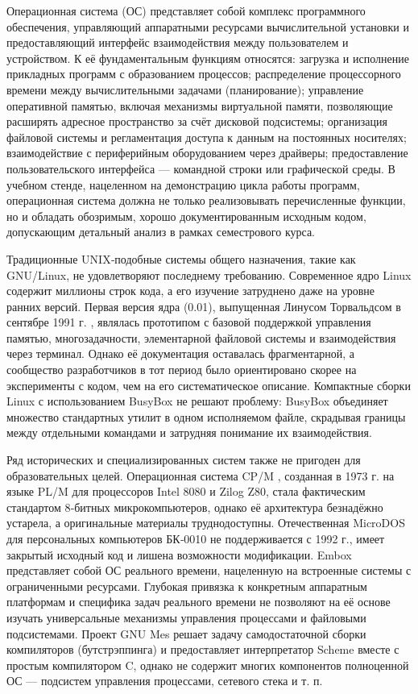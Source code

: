 Операционная система (ОС) представляет собой комплекс программного обеспечения, управляющий аппаратными ресурсами вычислительной установки и предоставляющий интерфейс взаимодействия между пользователем и устройством. К её фундаментальным функциям относятся: загрузка и исполнение прикладных программ с образованием процессов; распределение процессорного времени между вычислительными задачами (планирование); управление оперативной памятью, включая механизмы виртуальной памяти, позволяющие расширять адресное пространство за счёт дисковой подсистемы; организация файловой системы и регламентация доступа к данным на постоянных носителях; взаимодействие с периферийным оборудованием через драйверы; предоставление пользовательского интерфейса — командной строки или графической среды. В учебном стенде, нацеленном на демонстрацию цикла работы программ, операционная система должна не только реализовывать перечисленные функции, но и обладать обозримым, хорошо документированным исходным кодом, допускающим детальный анализ в рамках семестрового курса.

Традиционные UNIX‑подобные системы общего назначения, такие как GNU/Linux, не удовлетворяют последнему требованию. Современное ядро Linux содержит миллионы строк кода, а его изучение затруднено даже на уровне ранних версий. Первая версия ядра (0.01), выпущенная Линусом Торвальдсом в сентябре 1991 г. \cite{fstlinux}, являлась прототипом с базовой поддержкой управления памятью, многозадачности, элементарной файловой системы и взаимодействия через терминал. Однако её документация оставалась фрагментарной, а сообщество разработчиков в тот период было ориентировано скорее на эксперименты с кодом, чем на его систематическое описание. Компактные сборки Linux с использованием BusyBox \cite{BusyBox} не решают проблему: BusyBox объединяет множество стандартных утилит в одном исполняемом файле, скрадывая границы между отдельными командами и затрудняя понимание их взаимодействия.

Ряд исторических и специализированных систем также не пригоден для образовательных целей. Операционная система CP/M \cite{CPM}, созданная в 1973 г. на языке PL/M для процессоров Intel 8080 и Zilog Z80, стала фактическим стандартом 8‑битных микрокомпьютеров, однако её архитектура безнадёжно устарела, а оригинальные материалы труднодоступны. Отечественная MicroDOS \cite{MicroDOS} для персональных компьютеров БК‑0010 не поддерживается с 1992 г., имеет закрытый исходный код и лишена возможности модификации. Embox \cite{Embox} представляет собой ОС реального времени, нацеленную на встроенные системы с ограниченными ресурсами. Глубокая привязка к конкретным аппаратным платформам и специфика задач реального времени не позволяют на её основе изучать универсальные механизмы управления процессами и файловыми подсистемами. Проект GNU Mes \cite{GNUMes} решает задачу самодостаточной сборки компиляторов (бутстрэппинга) и предоставляет интерпретатор Scheme вместе с простым компилятором C, однако не содержит многих компонентов полноценной ОС — подсистем управления процессами, сетевого стека и т. п.

